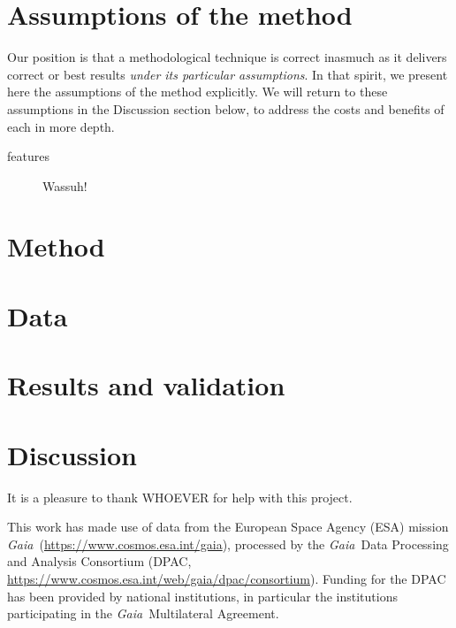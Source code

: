 \documentclass[modern]{aastex62}
\newcommand{\acronym}[1]{{\small{#1}}}
\newcommand{\project}[1]{\textsl{#1}}
\newcommand{\gaia}{\project{Gaia}}
\begin{document}
\section{Assumptions of the method}

Our position is that a methodological technique is correct inasmuch as
it delivers correct or best results \emph{under its particular assumptions}.
In that spirit, we present here the assumptions of the method
explicitly.
We will return to these assumptions in the Discussion section below,
to address the costs and benefits of each in more depth.
\begin{description}
\item[features] Wassuh!

\end{description}

\section{Method}

\section{Data}

\section{Results and validation}

\section{Discussion}

\acknowledgements
It is a pleasure to thank
  WHOEVER
for help with this project.

This work has made use of data from the European Space Agency (ESA) mission
\gaia\ (\url{https://www.cosmos.esa.int/gaia}), processed by the \gaia\ Data
Processing and Analysis Consortium (\acronym{DPAC},
\url{https://www.cosmos.esa.int/web/gaia/dpac/consortium}). Funding for the
\acronym{DPAC}
has been provided by national institutions, in particular the institutions
participating in the \gaia\ Multilateral Agreement.
\end{document}
